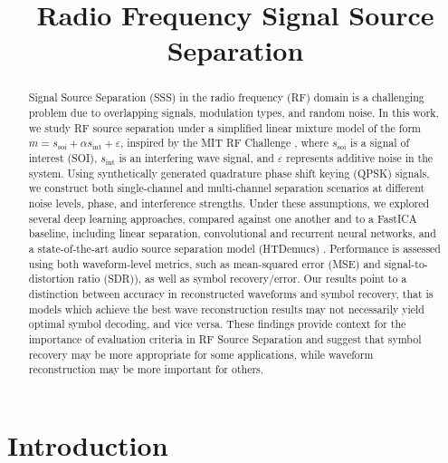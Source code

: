 \documentclass[conference]{IEEEtran}
\begin{document}
\title{Radio Frequency Signal Source Separation\\
}
\author{
\and
{}
\and
{}
}

\maketitle
\noindent
\begin{abstract}
Signal Source Separation (SSS) in the radio frequency (RF) domain is a challenging problem due to overlapping signals, modulation types, and random noise. In this work, we study RF source separation under a simplified linear mixture model of the form $m = s_\text{soi} + \alpha s_\text{int} + \varepsilon$, inspired by the MIT RF Challenge \cite{mit_rfchallenge}, where $s_\text{soi}$ is a signal of interest (SOI), $s_\text{int}$ is an interfering wave signal, and $\varepsilon$ represents additive noise in the system. Using synthetically generated quadrature phase shift keying (QPSK) signals, we construct both single-channel and multi-channel separation scenarios at different noise levels, phase, and interference strengths. Under these assumptions, we explored several deep learning approaches, compared against one another and to a FastICA baseline, including linear separation, convolutional and recurrent neural networks, and a state-of-the-art audio source separation model (HTDemucs) \cite{defossez2019demucs}. Performance is assessed using both waveform-level metrics, such as mean-squared error (MSE) and signal-to-distortion ratio (SDR)), as well as symbol recovery/error. Our results point to a distinction between accuracy in reconstructed waveforms and symbol recovery, that is models which achieve the best wave reconstruction results may not necessarily yield optimal symbol decoding, and vice versa. These findings provide context for the importance of evaluation criteria in RF Source Separation and suggest that symbol recovery may be more appropriate for some applications, while waveform reconstruction may be more important for others.
\end{abstract}

\section{Introduction}
\end{document}
